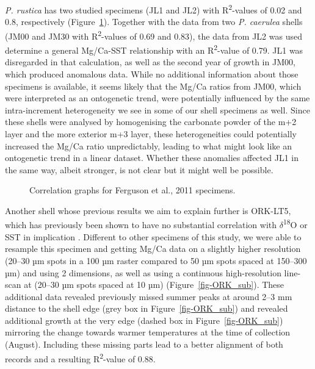 \documentclass[
  authoryear,
  preprint,
  3p]{elsarticle}
\begin{document}
\emph{P. rustica} has two studied specimens (JL1 and JL2) with
R\textsuperscript{2}-values of 0.02 and 0.8, respectively
\citep{Ferguson2011-zl} (Figure~\ref{fig-Ferg}). Together with the data
from two \emph{P. caerulea} shells (JM00 and JM30 with
R\textsuperscript{2}-values of 0.69 and 0.83), the data from JL2 was
used determine a general Mg/Ca-SST relationship with an
R\textsuperscript{2}-value of 0.79. JL1 was disregarded in that
calculation, as well as the second year of growth in JM00, which
produced anomalous data. While no additional information about those
specimens is available, it seems likely that the Mg/Ca ratios from JM00,
which were interpreted as an ontogenetic trend, were potentially
influenced by the same intra-increment heterogeneity we see in some of
our shell specimens as well. Since these shells were analysed by
homogenising the carbonate powder of the m+2 layer and the more exterior
m+3 layer, these heterogeneities could potentially increased the Mg/Ca
ratio unpredictably, leading to what might look like an ontogenetic
trend in a linear dataset. Whether these anomalies affected JL1 in the
same way, albeit stronger, is not clear but it might well be possible.

\begin{figure}


\caption{\label{fig-Ferg}Correlation graphs for Ferguson et al., 2011
specimens.}

\end{figure}%

Another shell whose previous results we aim to explain further is
ORK-LT5, which has previously been shown to have no substantial
correlation with \(\delta\)\textsuperscript{18}O or SST in implication
\citep{Graniero2017-io}. Different to other specimens of this study, we
were able to resample this specimen and getting Mg/Ca data on a slightly
higher resolution (20--30 µm spots in a 100 µm raster compared to 50 µm
spots spaced at 150--300 µm) and using 2 dimensions, as well as using a
continuous high-resolution line-scan at (20--30 µm spots spaced at 10
µm) (Figure~\ref{fig-ORK_sub}). These additional data revealed
previously missed summer peaks at around 2--3 mm distance to the shell
edge (grey box in Figure~\ref{fig-ORK_sub}) and revealed additional
growth at the very edge (dashed box in Figure~\ref{fig-ORK_sub})
mirroring the change towards warmer temperatures at the time of
collection (August). Including these missing parts lead to a better
alignment of both records and a resulting R\textsuperscript{2}-value of
0.88.
\end{document}

